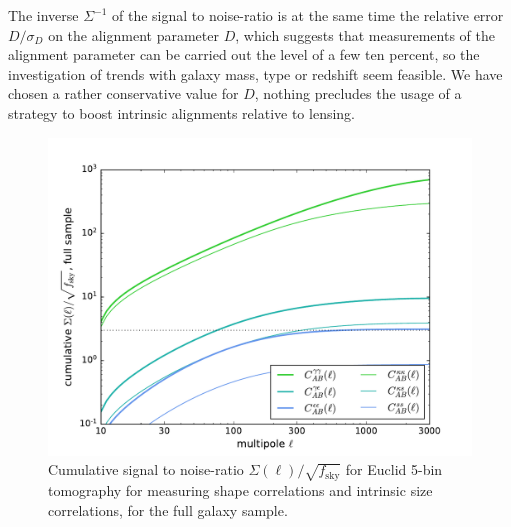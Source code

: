 \documentclass[a4paper,fleqn,usenatbib]{mnras}
\begin{document}
The inverse $\Sigma^{-1}$ of the signal to noise-ratio is at the same time the relative error $D/\sigma_D$ on the alignment parameter $D$, which suggests that measurements of the alignment parameter can be carried out the level of a few ten percent, so the investigation of trends with galaxy mass, type or redshift seem feasible. We have chosen a rather conservative value for $D$, nothing precludes the usage of a strategy to boost intrinsic alignments relative to lensing.

\begin{figure}
\centering
\includegraphics[scale=0.45]{./figures/sigma_all.pdf}
\caption{Cumulative signal to noise-ratio $\Sigma(\ell)/\sqrt{f_\mathrm{sky}}$ for Euclid 5-bin tomography for measuring shape correlations and intrinsic size correlations, for the full galaxy sample.}
\label{fig:s2n_all}
\end{figure}
\end{document}
